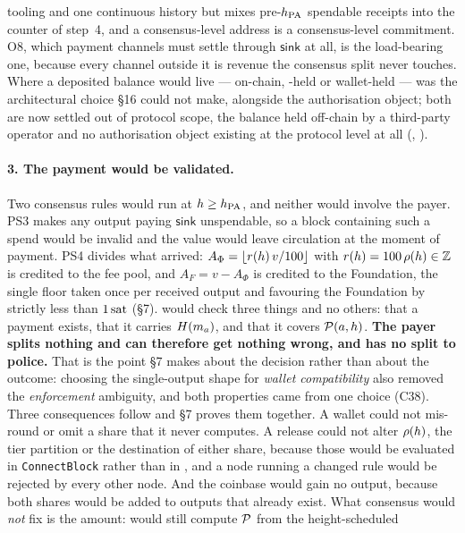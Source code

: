 tooling and one continuous history but mixes pre-$h_{\mathrm{PA}}$ spendable receipts into the counter of
step~4, and a consensus-level address is a consensus-level commitment. O8, which payment channels
must settle through $\mathsf{sink}$ at all, is the load-bearing one, because every channel outside it
is revenue the consensus split never touches. Where a deposited balance would live --- on-chain,
\FluxOS-held or wallet-held --- was the architectural choice \S16 could not make, alongside the
authorisation object; both are now settled out of protocol scope, the balance held off-chain by a
third-party operator and no authorisation object existing at the protocol level at all
(, ).

\paragraph{3. The payment would be validated.}
Two consensus rules would run at $h \ge h_{\mathrm{PA}}$, and neither would involve the payer. PS3 makes any
output paying $\mathsf{sink}$ unspendable, so a block containing such a spend would be invalid and
the value would leave circulation at the moment of payment. PS4 divides what arrived:
$A_\Phi = \lfloor r(h)\,v/100 \rfloor$ with $r(h) = 100\,\rho(h) \in \mathbb{Z}$ is
credited to the fee pool, and $A_F = v - A_\Phi$ is credited to the Foundation, the single floor
taken once per received output and favouring the Foundation by strictly less than $1\,\mathrm{sat}$ (\S7).
\FluxOS would check three things and no others: that a payment exists, that it carries $H(m_{a})$,
and that it covers $\mathcal{P}(a,h)$. \textbf{The payer splits nothing and can therefore get
nothing wrong, and \FluxOS has no split to police.} That is the point \S7 makes about the decision
rather than about the outcome: choosing the single-output shape for \emph{wallet compatibility} also
removed the \emph{enforcement} ambiguity, and both properties came from one choice (C38). Three
consequences follow and \S7 proves them together. A wallet could not mis-round or omit a share that
it never computes. A \FluxOS release could not alter $\rho(h)$, the tier partition or the
destination of either share, because those would be evaluated in \texttt{ConnectBlock} rather than in
\FluxOS, and a node running a changed rule would be rejected by every other node. And the coinbase
would gain no output, because both shares would be added to outputs that already exist. What consensus
would \emph{not} fix is the amount: \FluxOS would still compute $\mathcal{P}$ from the height-scheduled

